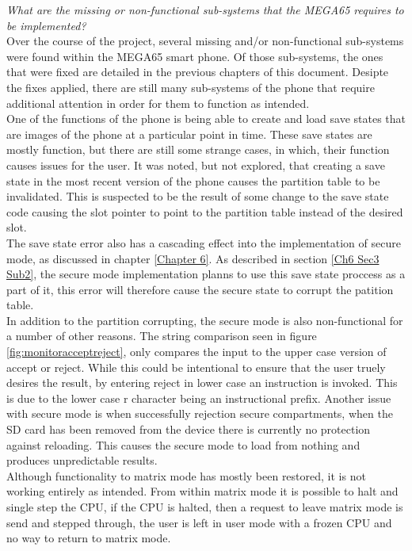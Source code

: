 \textit{What are the missing or non-functional sub-systems that the MEGA65 requires to be implemented?}\\
Over the course of the project, several missing and/or non-functional sub-systems were found within the MEGA65 smart phone. Of those sub-systems, the ones that were fixed are detailed in the previous chapters of this document. Desipte the fixes applied, there are still many sub-systems of the phone that require additional attention in order for them to function as intended.\\
One of the functions of the phone is being able to create and load save states that are images of the phone at a particular point in time. These save states are mostly function, but there are still some strange cases, in which, their function causes issues for the user. It was noted, but not explored, that creating a save state in the most recent version of the phone causes the partition table to be invalidated. This is suspected to be the result of some change to the save state code causing the slot pointer to point to the partition table instead of the desired slot.\\
The save state error also has a cascading effect into the implementation of secure mode, as discussed in chapter \ref{Chapter 6}. As described in section \ref{Ch6 Sec3 Sub2}, the secure mode implementation planns to use this save state proccess as a part of it, this error will therefore cause the secure state to corrupt the patition table.\\
In addition to the partition corrupting, the secure mode is also non-functional for a number of other reasons. The string comparison seen in figure \ref{fig:monitoracceptreject}, only compares the input to the upper case version of accept or reject. While this could be intentional to ensure that the user truely desires the result, by entering reject in lower case an instruction is invoked. This is due to the lower case r character being an instructional prefix. Another issue with secure mode is when successfully rejection secure compartments, when the SD card has been removed from the device there is currently no protection against reloading. This causes the secure mode to load from nothing and produces unpredictable results.\\
Although functionality to matrix mode has mostly been restored, it is not working entirely as intended. From within matrix mode it is possible to halt and single step the CPU, if the CPU is halted, then a request to leave matrix mode is send and stepped through, the user is left in user mode with a frozen CPU and no way to return to matrix mode.
